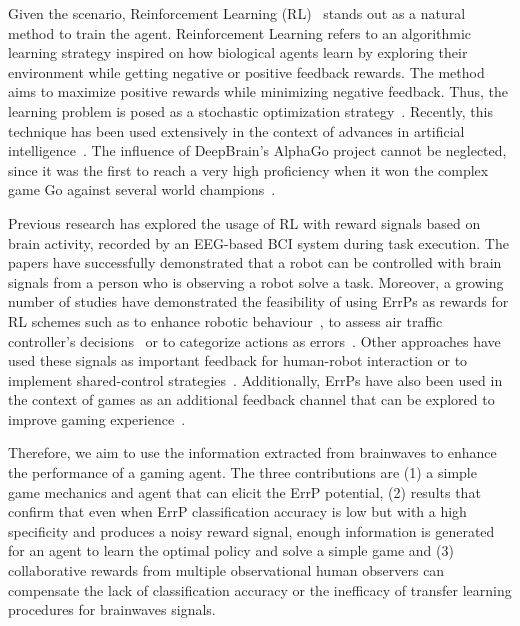 \documentclass[journal]{IEEEtran}
\begin{document}
Given the scenario, Reinforcement Learning (RL)~\cite{Sutton2018} stands out as a natural method to train the agent.  Reinforcement Learning refers to an algorithmic learning strategy inspired on how biological agents learn by exploring their environment while getting negative or positive feedback rewards.  The method aims to maximize positive rewards while minimizing negative feedback.  Thus, the learning problem is posed as a stochastic optimization strategy~\cite{Santos1999}.  Recently, this technique has been used extensively in the context of advances in artificial intelligence~\cite{Nguyen2020}. The influence of DeepBrain's AlphaGo project cannot be neglected, since it was the first to reach a very high proficiency when it won the complex game Go against several world champions~\cite{ALPHA-GO}.


Previous research has explored the usage of RL with reward signals based on brain activity, recorded by an EEG-based BCI system during task execution. The papers \cite{ROBOT-CONTROL-PAPER,Kim2017,Omedes2013} have successfully demonstrated that a robot can be controlled with brain signals from a person who is observing a robot solve a task.  Moreover, a growing number of studies have demonstrated the feasibility of using ErrPs as rewards for RL schemes such as to enhance robotic behaviour~\cite{Luo2019}, to assess air traffic controller's decisions~\cite{Goh2019} or to categorize actions as errors~\cite{Wirth2020}. Other approaches have used these signals as important feedback for human-robot interaction or to implement shared-control strategies~\cite{Schiatti2018,Iturrate2013}.  Additionally, ErrPs have also been used in the context of games as an additional feedback channel that can be explored to improve gaming experience~\cite{Plass-OudeBos2010,kober2018bci}. 

Therefore,  we aim to use the information extracted from brainwaves to enhance the performance of a gaming agent.  The three contributions are (1) a simple game mechanics and agent that can elicit the ErrP potential, (2) results that confirm that even when ErrP classification accuracy is low but with a high specificity and produces a noisy reward signal, enough information is generated for an agent to learn the optimal policy and solve a simple game and (3) collaborative rewards from multiple observational human observers can compensate the lack of classification accuracy or the inefficacy of transfer learning procedures for brainwaves signals.
\end{document}
